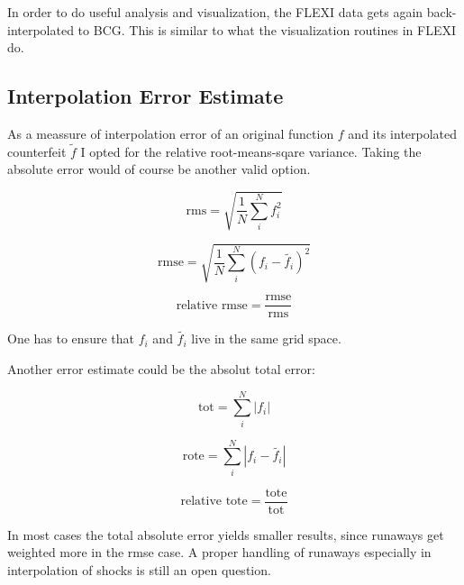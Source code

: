 In order to do useful analysis and visualization, the FLEXI data gets again
back-interpolated to BCG. This is similar to what the visualization routines in
FLEXI do.

\subsection{Interpolation Error Estimate}

As a meassure of interpolation error of an original function $f$ and its
interpolated counterfeit $\widetilde{f}$ I opted for the relative
root-means-sqare variance. Taking the absolute error would of course be another
valid option.

\begin{equation}
    \text{rms} = \sqrt{\frac{1}{N} \sum^N_i f^2_i} 
\end{equation}

\begin{equation}
    \text{rmse} = \sqrt{\frac{1}{N} \sum^N_i (f_i - \widetilde{f_i})^2} 
\end{equation}

\begin{equation}
    \text{relative rmse} = \frac{\text{rmse}}{\text{rms}} 
\end{equation}

One has to ensure that $f_i$ and $\widetilde{f_i}$ live in the same grid space.

Another error estimate could be the absolut total error:

\begin{equation}
    \text{tot} = \sum^N_i |f_i|
\end{equation}

\begin{equation}
    \text{rote} = \sum^N_i |f_i - \widetilde{f_i}|
\end{equation}

\begin{equation}
    \text{relative tote} = \frac{\text{tote}}{\text{tot}} 
\end{equation}

In most cases the total absolute error yields smaller results, since runaways
get weighted more in the rmse case. A proper handling of runaways especially in
interpolation of shocks is still an open question.
